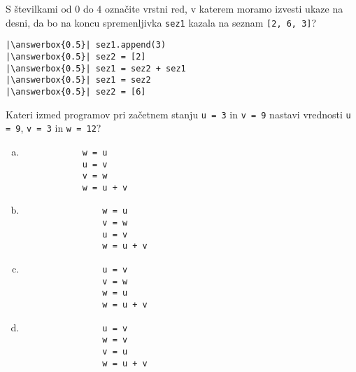 \documentclass[arhiv, 10pt]{../izpit}
\newcommand{\inlinepy}[1]{\texttt{#1}}
\newcommand{\answerbox}[1]{\framebox{\vphantom{\large M}\hspace{#1cm}}}
\begin{document}
        \naloga*
        \begin{multicols}{2}
        \noindent 
        S številkami od $0$ do $4$ označite vrstni red, v katerem moramo izvesti ukaze na desni, da bo na koncu spremenljivka \inlinepy{sez1} kazala na seznam \inlinepy{[2, 6, 3]}?
    
        \columnbreak
        \noindent
        \begin{verbatim}
|\answerbox{0.5}| sez1.append(3)
|\answerbox{0.5}| sez2 = [2]
|\answerbox{0.5}| sez1 = sez2 + sez1
|\answerbox{0.5}| sez1 = sez2
|\answerbox{0.5}| sez2 = [6]

        \end{verbatim}
        \end{multicols}
    
            
        \naloga*
        
        Kateri izmed programov pri začetnem stanju
            \inlinepy{u = 3} in
            \inlinepy{v = 9}
        nastavi vrednosti
            \inlinepy{u = 9},
            \inlinepy{v = 3} in
            \inlinepy{w = 12}?
    
        \begin{multicols}{4}
        \begin{enumerate}[(a)]
\item 
            \begin{verbatim}
            w = u
            u = v
            v = w
            w = u + v
            \end{verbatim}
        
\item 
                \begin{verbatim}
                w = u
                v = w
                u = v
                w = u + v
                \end{verbatim}
            
\item 
                \begin{verbatim}
                u = v
                v = w
                w = u
                w = u + v
                \end{verbatim}
            
\item 
                \begin{verbatim}
                u = v
                w = v
                v = u
                w = u + v
                \end{verbatim}
            
\end{enumerate}

        \end{multicols}
    
\end{document}

